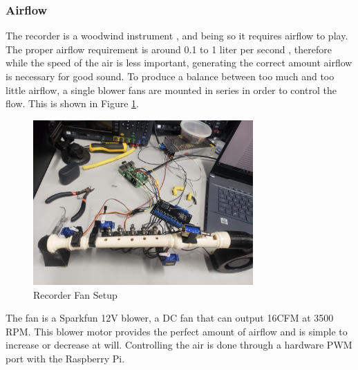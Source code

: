 \documentclass[UTF8, 12pt]{article}
\begin{document}
\subsubsection{Airflow}
    The recorder is a woodwind instrument \cite{rec_wiki}, and being so it requires airflow to play. The proper airflow requirement is around 0.1 to 1 liter per second \cite{rec_info}, therefore while the speed of the air is less important, generating the correct amount airflow is necessary for good sound. To produce a balance between too much and too little airflow, a single blower fans are mounted in series in order to control the flow. This is shown in Figure \ref{fan_fig}.
    \begin{figure}[h]
        \centering
        \includegraphics[width=0.75\textwidth]{recorder_fan.png}
        \caption{Recorder Fan Setup}
        \label{fan_fig}
    \end{figure}
    The fan is a Sparkfun 12V blower, a DC fan that can output 16CFM at 3500 RPM\cite{fan_info}. This blower motor provides the perfect amount of airflow and is simple to increase or decrease at will. Controlling the air is done through a hardware PWM port with the Raspberry Pi.
\end{document}
